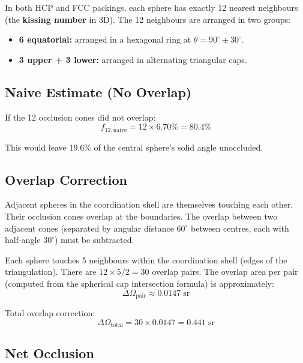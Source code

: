 In both HCP and FCC packings, each sphere has exactly 12 nearest neighbours (the \textbf{kissing number} in 3D). The 12 neighbours are arranged in two groups:
\begin{itemize}
  \item \textbf{6 equatorial:} arranged in a hexagonal ring at $\theta = 90^\circ \pm 30^\circ$.
  \item \textbf{3 upper + 3 lower:} arranged in alternating triangular caps.
\end{itemize}

\subsection{Naive Estimate (No Overlap)}

If the 12 occlusion cones did not overlap:
\begin{equation}
  f_{12,\text{naive}} = 12 \times 6.70\% = 80.4\%
\end{equation}

This would leave 19.6\% of the central sphere's solid angle unoccluded.

\subsection{Overlap Correction}

Adjacent spheres in the coordination shell are themselves touching each other. Their occlusion cones overlap at the boundaries. The overlap between two adjacent cones (separated by angular distance $60^\circ$ between centres, each with half-angle $30^\circ$) must be subtracted.

Each sphere touches 5 neighbours within the coordination shell (edges of the triangulation). There are $12 \times 5 / 2 = 30$ overlap pairs. The overlap area per pair (computed from the spherical cap intersection formula) is approximately:
\begin{equation}
  \Delta\Omega_{\text{pair}} \approx 0.0147\;\text{sr}
\end{equation}

Total overlap correction:
\begin{equation}
  \Delta\Omega_{\text{total}} = 30 \times 0.0147 = 0.441\;\text{sr}
\end{equation}

\subsection{Net Occlusion}

